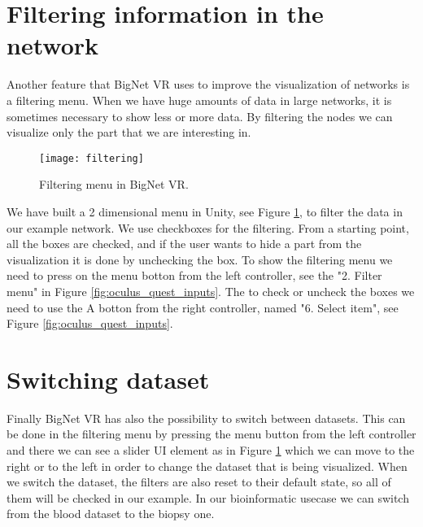 \section{Filtering information in the network}
Another feature that BigNet VR uses to improve the visualization of networks is a filtering menu. When we have huge amounts of data in large networks, it is sometimes necessary to show less or more data. By filtering the nodes we can visualize only the part that we are interesting in.


\begin{figure}[h!]
    \centering%
    \texttt{[image: filtering]}
    \caption{Filtering menu in BigNet VR.}
    \label{fig:filtering}
\end{figure}%


We have built a 2 dimensional menu in Unity, see Figure \ref{fig:filtering}, to filter the data in our example network. We use checkboxes for the filtering. From a starting point, all the boxes are checked, and if the user wants to hide a part from the visualization it is done by unchecking the box. To show the filtering menu we need to press on the menu botton from the left controller, see the "2. Filter menu" in Figure \ref{fig:oculus_quest_inputs}. The to check or uncheck the boxes we need to use the A botton from the right controller, named "6. Select item", see Figure \ref{fig:oculus_quest_inputs}.

\section{Switching dataset}
Finally BigNet VR has also the possibility to switch between datasets. This can be done in the filtering menu by pressing the menu button from the left controller and there we can see a slider UI element as in Figure \ref{fig:filtering} which we can move to the right or to the left in order to change the dataset that is being visualized. When we switch the dataset, the filters are also reset to their default state, so all of them will be checked in our example. In our bioinformatic usecase we can switch from the blood dataset to the biopsy one.
